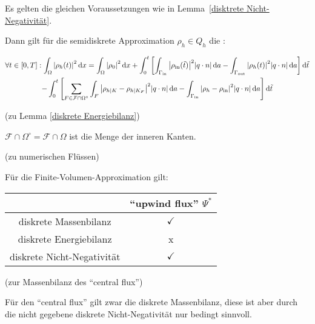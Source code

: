 \begin{Lemma} \label{diskrete Energiebilanz}	Es gelten die gleichen Voraussetzungen wie in Lemma~\ref{disktrete Nicht-Negativität}.
	
	Dann gilt für die semidiskrete Approximation $ \rho_h \in Q_h $ die :
	
	\begin{gather*}
		\forall t \in [0,T]: \int_\Omega \abs{\rho_h(t)}^2 \diff x = \int_\Omega \abs{\rho_0}^2 \diff x + \int_{0}^{t} \left[ \int_{\Gammain} \abs{\rhoin(\tilde{t})}^2 \abs{q \cdot n} \diff a - \int_{\Gammaout} \abs{\rho_h(t)}^2 \abs{q \cdot n} \diff a \right] \diff \tilde{t} \\
		 -\int_0^t \left[ \sum_{F\in \mathcal{F} \cap \Omega^\circ} \int_F \abs{\rho_{h|K} - \rho_{h|K_F}}^2 \abs{q \cdot n} \diff a - \int_{\Gammain} \abs{\rho_h - \rhoin}^2 \abs{q\cdot n} \diff a \right] \diff \tilde{t}
	\end{gather*}
	
\end{Lemma}
 
 
 \begin{remark}(zu Lemma \ref{diskrete Energiebilanz})
 	
 	$ \mathcal{F} \cap \Omega^\circ = \mathcal{F} \cap \Omega $ ist die Menge der inneren Kanten.
 \end{remark}

\begin{remark}(zu numerischen Flüssen)
	

	Für die Finite-Volumen-Approximation gilt:
    \begin{center}
	\begin{tabular}{c || c }
		&\enquote{upwind flux} $ \Psi^* $   \\ \hline 
		diskrete Massenbilanz & $\checkmark$  \\ \hline
		diskrete Energiebilanz & x  \\ \hline
		diskrete Nicht-Negativität & $\checkmark$   \\
	\end{tabular}
    \end{center}
\end{remark}
\begin{remark}(zur Massenbilanz des \enquote{central flux})

  Für den \enquote{central flux} gilt zwar die diskrete Massenbilanz, diese ist aber durch die nicht gegebene diskrete Nicht-Negativität nur bedingt sinnvoll. 
\end{remark}

